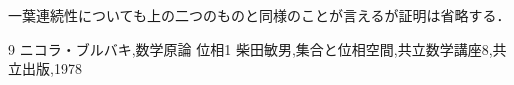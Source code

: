\documentclass[leqno]{jsarticle}
\begin{document}
一葉連続性についても上の二つのものと同様のことが言えるが証明は省略する．



\begin{thebibliography}{9}
ニコラ・ブルバキ,数学原論 位相1
柴田敏男,集合と位相空間,共立数学講座8,共立出版,1978
\end{thebibliography}












			
\end{document}
